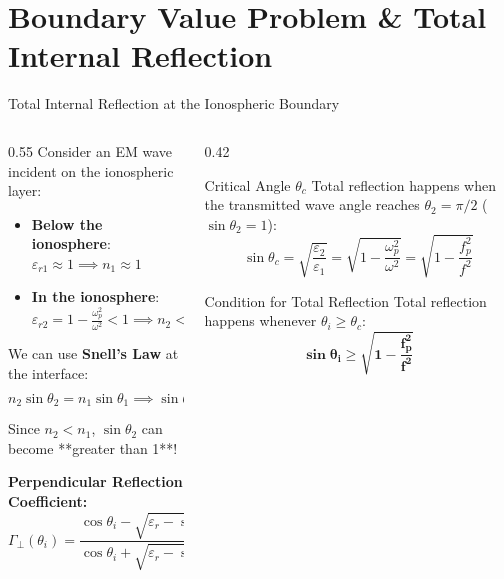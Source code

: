\documentclass[aspectratio=169, 10pt]{beamer}
\begin{document}
\section{Boundary Value Problem \& Total Internal Reflection}

\begin{frame}{Total Internal Reflection at the Ionospheric Boundary}
    \begin{columns}[c]
        \begin{column}{0.55\textwidth}
            Consider an EM wave incident on the ionospheric layer:
            \begin{itemize}
                \item \textbf{Below the ionosphere}: $\varepsilon_{r1} \approx 1 \implies n_1 \approx 1$
                \item \textbf{In the ionosphere}: $\varepsilon_{r2} = 1 - \frac{\omega_p^2}{\omega^2} < 1 \implies n_2 < n_1$
            \end{itemize}
            We can use \textbf{Snell's Law} at the interface:
            \begin{equation}
                n_2 \sin\theta_2 = n_1 \sin\theta_1 \implies \sin\theta_2 = \frac{n_1}{n_2} \sin\theta_i = \frac{\sin\theta_i}{\sqrt{\varepsilon_r}}
            \end{equation}
            Since $n_2 < n_1$, $\sin\theta_2$ can become **greater than 1**!
            
            \vspace{0.1cm}
            \textbf{Perpendicular Reflection Coefficient:}
            \begin{equation}
                \Gamma_\perp(\theta_i) = \frac{\cos\theta_i - \sqrt{\varepsilon_r - \sin^2\theta_i}}{\cos\theta_i + \sqrt{\varepsilon_r - \sin^2\theta_i}}
            \end{equation}
        \end{column}
        \begin{column}{0.42\textwidth}
            \begin{block}{Critical Angle $\theta_c$}
                Total reflection happens when the transmitted wave angle reaches $\theta_2 = \pi/2$ ($\sin\theta_2 = 1$):
                \begin{equation}
                    \sin\theta_c = \sqrt{\frac{\varepsilon_2}{\varepsilon_1}} = \sqrt{1 - \frac{\omega_p^2}{\omega^2}} = \sqrt{1 - \frac{f_p^2}{f^2}}
                \end{equation}
            \end{block}
            \begin{alertblock}{Condition for Total Reflection}
                Total reflection happens whenever $\theta_i \ge \theta_c$:
                \begin{equation}
                    \mathbf{\sin\theta_i \ge \sqrt{1 - \frac{f_p^2}{f^2}}}
                \end{equation}
            \end{alertblock}
        \end{column}
    \end{columns}
\end{frame}
\end{document}
